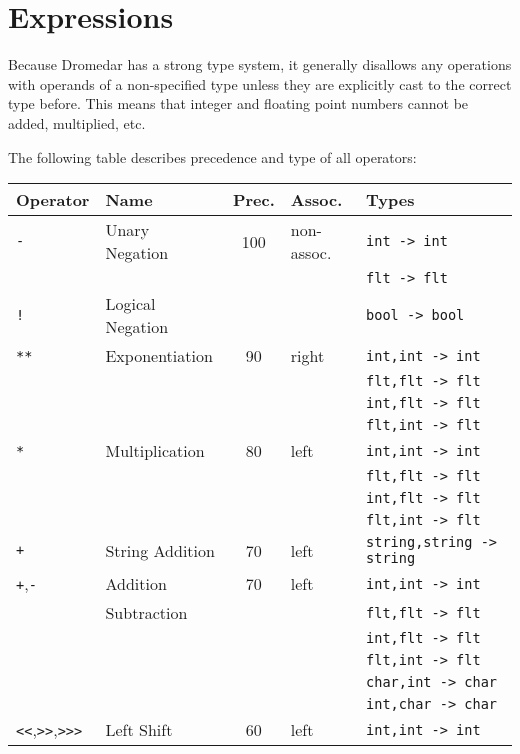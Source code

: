 \documentclass{article}
\newcommand{\code}[1]{\lstinline[columns=fixed]{#1}}
\begin{document}
	\section{Expressions}
	
		Because Dromedar has a strong type system, it generally disallows any operations with operands of a non-specified type unless they are explicitly cast to the correct type before. This means that integer and floating point numbers cannot be added, multiplied, etc.
		
		The following table describes precedence and type of all operators:\\
		
		\begin{tabular}{l|l|c|l|l}
			\textbf{Operator} & \textbf{Name} & \textbf{Prec.} & \textbf{Assoc.} & \textbf{Types}\\
			\midrule
			\code{-} & Unary Negation & 100 & non-assoc. & \code{int -> int}\\
				&&&& \code{flt -> flt}\\
			\code{!} & Logical Negation &&& \code{bool -> bool}\\
			\midrule
			\code{**} & Exponentiation & 90 & right & \code{int,int -> int}\\
				&&&& \code{flt,flt -> flt}\\
				&&&& \code{int,flt -> flt}\\
				&&&& \code{flt,int -> flt}\\
			\midrule
			\code{*} & Multiplication & 80 & left &
					 \code{int,int -> int}\\
				&&&& \code{flt,flt -> flt}\\
				&&&& \code{int,flt -> flt}\\
				&&&& \code{flt,int -> flt}\\
			\midrule
			\code{+} & String Addition & 70 & left &
				\code{string,string -> string}\\
			\midrule
			\code{+},\code{-} & Addition & 70 & left &
					 \code{int,int -> int}\\
				& Subtraction &&&
					 \code{flt,flt -> flt}\\
				&&&& \code{int,flt -> flt}\\
				&&&& \code{flt,int -> flt}\\
				&&&& \code{char,int -> char}\\
				&&&& \code{int,char -> char}\\
			\midrule
			\code{<<},\code{>>},\code{>>>} & Left Shift & 60 & left & \code{int,int -> int}\\

\end{tabular}
\end{document}
